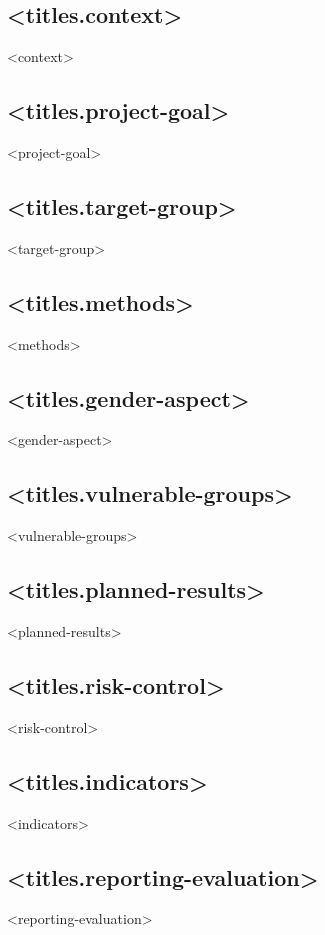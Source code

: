 \documentclass[twoside,a4paper]{article}
\begin{document}
		\subsection*{<titles.context>}
		    <context>

		\subsection*{<titles.project-goal>}
		    <project-goal>
		
		\subsection*{<titles.target-group>}
		    <target-group>
		
		\subsection*{<titles.methods>}
		    <methods>
		
		\subsection*{<titles.gender-aspect>}
		    <gender-aspect>
		
		\subsection*{<titles.vulnerable-groups>}
		    <vulnerable-groups>
		
		\subsection*{<titles.planned-results>}
		    <planned-results>
		
		\subsection*{<titles.risk-control>}
		    <risk-control>
		
		\subsection*{<titles.indicators>}
		    <indicators>
		
		\subsection*{<titles.reporting-evaluation>}
		    <reporting-evaluation>
\end{document}
